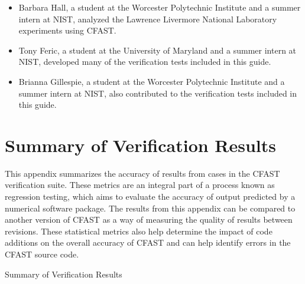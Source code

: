 \documentclass[12pt]{book}
\begin{document}
\begin{itemize}
\item Barbara Hall, a student at the Worcester Polytechnic Institute and a summer intern at NIST, analyzed the Lawrence Livermore National Laboratory experiments using CFAST.

\item Tony Feric, a student at the University of Maryland and a summer intern at NIST, developed many of the verification tests included in this guide.

\item Brianna Gillespie, a student at the Worcester Polytechnic Institute and a summer intern at NIST, also contributed to the verification tests included in this guide.

\end{itemize}

\cleardoublepage
\tableofcontents

\clearpage
\listoffigures

\listoftables

\mainmatter








%










\appendix
{}



\chapter{Summary of Verification Results}
\label{info:verification_statistics}

This appendix summarizes the accuracy of results from cases in the CFAST verification suite. These metrics are an integral part of a process known as regression testing, which aims to evaluate the accuracy of output predicted by a numerical software package. The results from this appendix can be compared to another version of CFAST as a way of measuring the quality of results between revisions. These statistical metrics also help determine the impact of code additions on the overall accuracy of CFAST and can help identify errors in the CFAST source code.

\begin{table}

\caption{Summary of Verification Results}
\label{tab:Summary_Verification_Diffs}
\vspace{0.1in}

\end{table}



\end{document}

